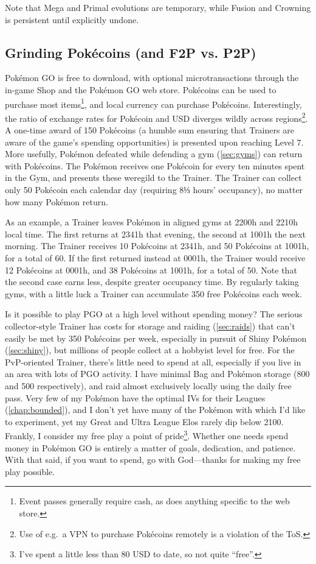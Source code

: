 Note that Mega and Primal evolutions are temporary, while Fusion and Crowning is persistent
  until explicitly undone.
\subsection{Grinding Pokécoins (and F2P vs. P2P)\label{subsec:getcoins}}
Pokémon GO is free to download, with optional microtransactions through the in-game
  Shop and the Pokémon GO web store.
Pokécoins can be used to purchase most items\footnote{Event passes generally require cash,
  as does anything specific to the web store.}, and local currency can purchase Pokécoins.
Interestingly, the ratio of exchange rates for Pokécoin and USD diverges
  wildly across regions\footnote{Use of e.g.\ a VPN to purchase Pokécoins remotely is a violation of the ToS\@.}.
A one-time award of 150 Pokécoins (a humble sum ensuring that Trainers are aware of the game's spending opportunities)
  is presented upon reaching Level 7.
More usefully, Pokémon defeated while defending a gym (\autoref{sec:gyms}) can
  return with Pokécoins.
The Pokémon receives one Pokécoin for every ten minutes spent in the Gym, and presents these weregild to the Trainer.
The Trainer can collect only 50 Pokécoin each calendar day (requiring 8⅓ hours' occupancy), no matter how many Pokémon return.

As an example, a Trainer leaves Pokémon in aligned gyms at 2200h and 2210h local time.
The first returns at 2341h that evening, the second at 1001h the next morning.
The Trainer receives 10 Pokécoins at 2341h, and 50 Pokécoins at 1001h, for a total of 60.
If the first returned instead at 0001h, the Trainer would receive 12 Pokécoins at 0001h,
  and 38 Pokécoins at 1001h, for a total of 50.
Note that the second case earns less, despite greater occupancy time.
By regularly taking gyms, with a little luck a Trainer can accumulate 350 free Pokécoins each week.

Is it possible to play PGO at a high level without spending money?
The serious collector-style Trainer has costs for storage and raiding (\autoref{sec:raids})
  that can't easily be met by 350 Pokécoins per week, especially
  in pursuit of Shiny Pokémon (\autoref{sec:shiny}),
  but millions of people collect at a hobbyist level for free.
For the PvP-oriented Trainer, there's little need to spend at all,
  especially if you live in an area with lots of PGO activity.
I have minimal Bag and Pokémon storage (800 and 500 respectively), and raid almost exclusively locally using the daily free pass.
Very few of my Pokémon have the optimal IVs for their Leagues (\autoref{chap:bounded}),
  and I don't yet have many of the Pokémon with which I'd like to experiment,
  yet my Great and Ultra League Elos rarely dip below 2100.
Frankly, I consider my free play a point of pride\footnote{I've spent a little less than 80 USD to date, so not quite ``free''.}.
Whether one needs spend money in Pokémon GO is entirely a matter of goals, dedication, and patience.
With that said, if you want to spend, go with God---thanks for making my free play possible.

